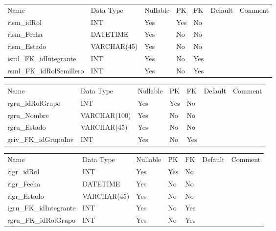 			\begin{center}
				\begin{tabular}{ |l|l|l|l|l|l|l| }
					\hline
					Name & Data Type & Nullable & PK & FK & Default & Comment \\
					rism_idRol & INT & Yes & Yes & No &  & \\ \hline 
rism_Fecha & DATETIME & Yes & No & No &  & \\ \hline 
rism_Estado & VARCHAR(45) & Yes & No & No &  & \\ \hline 
isml_FK_idIntegrante & INT & Yes & No & Yes &  & \\ \hline 
rsml_FK_idRolSemillero & INT & Yes & No & Yes &  & \\ \hline 

				\end{tabular}
			\end{center}
		

			\begin{center}
				\begin{tabular}{ |l|l|l|l|l|l|l| }
					\hline
					Name & Data Type & Nullable & PK & FK & Default & Comment \\
					rgru_idRolGrupo & INT & Yes & Yes & No &  & \\ \hline 
rgru_Nombre & VARCHAR(100) & Yes & No & No &  & \\ \hline 
rgru_Estado & VARCHAR(45) & Yes & No & No &  & \\ \hline 
griv_FK_idGrupoInv & INT & Yes & No & Yes &  & \\ \hline 

				\end{tabular}
			\end{center}
		

			\begin{center}
				\begin{tabular}{ |l|l|l|l|l|l|l| }
					\hline
					Name & Data Type & Nullable & PK & FK & Default & Comment \\
					rigr_idRol & INT & Yes & Yes & No &  & \\ \hline 
rigr_Fecha & DATETIME & Yes & No & No &  & \\ \hline 
rigr_Estado & VARCHAR(45) & Yes & No & No &  & \\ \hline 
igru_FK_idIntegrante & INT & Yes & No & Yes &  & \\ \hline 
rgru_FK_idRolGrupo & INT & Yes & No & Yes &  & \\ \hline 

				\end{tabular}
			\end{center}
		

